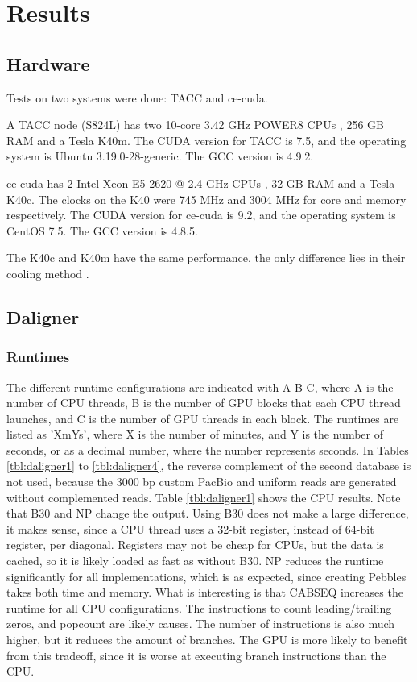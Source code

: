 \documentclass[../thesis.tex]{subfiles}
\begin{document}
\chapter{Results}
\ifdefined\main
\newcommand{\codePath}{5_results/code/}
\newcommand{\figPath}{5_results/figures/}
\else

\fi

\section{Hardware}
Tests on two systems were done: TACC \cite{TACC} and ce-cuda.

A TACC node (S824L) has two 10-core 3.42 GHz POWER8 CPUs \cite{datasheet_TACC}, 256 GB RAM and a Tesla K40m.
The CUDA version for TACC is 7.5, and the operating system is Ubuntu 3.19.0-28-generic.
The GCC version is 4.9.2.

ce-cuda has 2 Intel Xeon E5-2620 @ 2.4 GHz CPUs \cite{datasheet_ce_cuda}, 32 GB RAM and a Tesla K40c.
The clocks on the K40 were 745 MHz and 3004 MHz for core and memory respectively.
The CUDA version for ce-cuda is 9.2, and the operating system is CentOS 7.5.
The GCC version is 4.8.5.

The K40c and K40m have the same performance, the only difference lies in their cooling method \cite{K40m}.

\section{Daligner}
\subsection{Runtimes}
The different runtime configurations are indicated with A B C, where A is the number of CPU threads, B is the number of GPU blocks that each CPU thread launches, and C is the number of GPU threads in each block.
The runtimes are listed as 'XmYs', where X is the number of minutes, and Y is the number of seconds, or as a decimal number, where the number represents seconds.
In Tables \ref{tbl:daligner1} to \ref{tbl:daligner4}, the reverse complement of the second database is not used, because the 3000 bp custom PacBio and uniform reads are generated without complemented reads.
Table \ref{tbl:daligner1} shows the CPU results.
Note that B30 and NP change the output.
Using B30 does not make a large difference, it makes sense, since a CPU thread uses a 32-bit register, instead of 64-bit register, per diagonal.
Registers may not be cheap for CPUs, but the data is cached, so it is likely loaded as fast as without B30.
NP reduces the runtime significantly for all implementations, which is as expected, since creating Pebbles takes both time and memory.
What is interesting is that CABSEQ increases the runtime for all CPU configurations.
The instructions to count leading/trailing zeros, and popcount are likely causes.
The number of instructions is also much higher, but it reduces the amount of branches.
The GPU is more likely to benefit from this tradeoff, since it is worse at executing branch instructions than the CPU.
\end{document}
